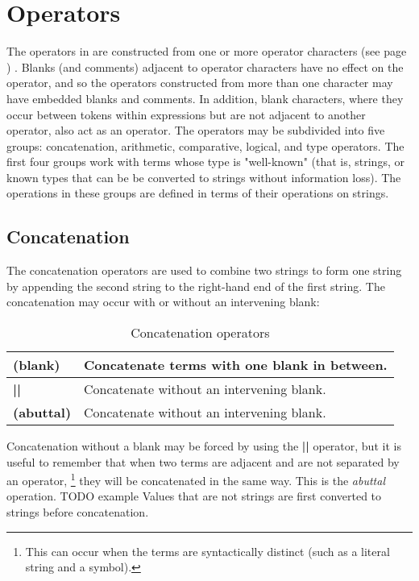 \section{Operators}\label{refops}
 The operators in \nr{} are constructed from one or more
 operator characters (see page \pageref{refopers}) .
Blanks (and comments) adjacent to operator characters have no effect on
the operator, and so the operators constructed from more than one
character may have embedded blanks and comments.
In addition, blank characters, where they occur between tokens within
expressions but are not adjacent to another operator, also act as an
operator.
 The operators may be subdivided into five groups: concatenation,
arithmetic, comparative, logical, and type operators.  The first four
groups work with terms whose type is "well-known" (that is,
strings, or known types that can be be converted to strings without
information loss).  The operations in these groups are defined in terms
of their operations on strings.
\subsection{Concatenation}
The concatenation operators are used to combine two strings to form
one string by appending the second string to the right-hand end of the
first string.  The concatenation may occur with or without an
intervening blank:
\begin{table}\caption{Concatenation operators}
\begin{tabularx}{\textwidth}{>{\bfseries}lX}
\toprule
(blank)&Concatenate terms with one blank in between.
\\\midrule
||&Concatenate without an intervening blank.
\\\midrule
(abuttal)\label{refabut}&Concatenate without an intervening blank.
\\\bottomrule
\end{tabularx}
\end{table}
 Concatenation without a blank may be forced by using
the \textbf{||} operator, but it is useful to remember that
when two terms are adjacent and are not separated by an operator,
\footnote{
This can occur when the terms are syntactically distinct (such as a
literal string and a symbol).
}
they will be concatenated in the same way.
This is the \emph{abuttal} operation.
TODO example
 Values that are not strings are first converted to strings before
concatenation.
